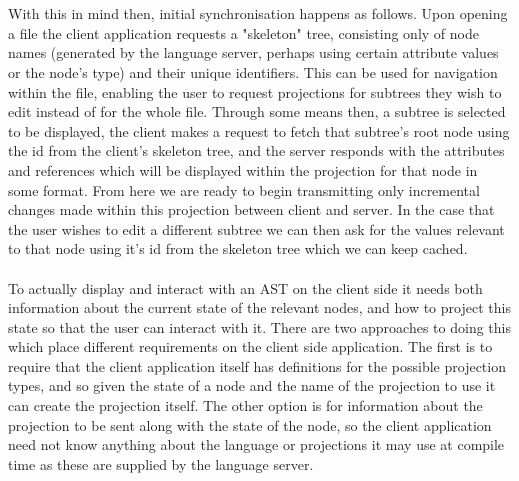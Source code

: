 \documentclass{article}
\begin{document}
\\
\\
With this in mind then, initial synchronisation happens as follows. Upon opening a file the client application requests a "skeleton" tree, consisting only of node names (generated by the language server, perhaps using certain attribute values or the node's type) and their unique identifiers. This can be used for navigation within the file, enabling the user to request projections for subtrees they wish to edit instead of for the whole file. Through some means then, a subtree is selected to be displayed, the client makes a request to fetch that subtree's root node using the id from the client's skeleton tree, and the server responds with the attributes and references which will be displayed within the projection for that node in some format. From here we are ready to begin transmitting only incremental changes made within this projection between client and server. In the case that the user wishes to edit a different subtree we can then ask for the values relevant to that node using it's id from the skeleton tree which we can keep cached.
\\
\\
To actually display and interact with an AST on the client side it needs both information about the current state of the relevant nodes, and how to project this state so that the user can interact with it. 
There are two approaches to doing this which place different requirements on the client side application. The first is to require that the client application itself has definitions for the possible projection types, and so given the state of a node and the name of the projection to use it can create the projection itself. The other option is for information about the projection to be sent along with the state of the node, so the client application need not know anything about the language or projections it may use at compile time as these are supplied by the language server.
\\
\\
\end{document}
